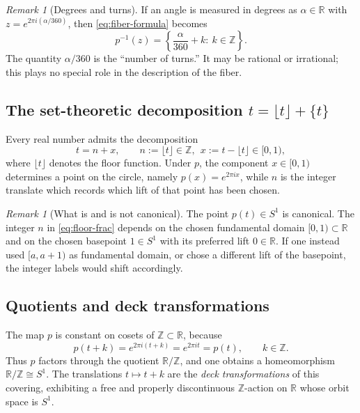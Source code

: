 \documentclass[11pt,a4paper]{article}
\theoremstyle{definition}
\theoremstyle{remark}
\newtheorem{remark}[theorem]{Remark}
\begin{document}
\begin{remark}[Degrees and turns]
\label{rem:degrees}
If an angle is measured in degrees as \(\alpha\in \mathbb{R}\) with \(z=e^{2\pi i (\alpha/360)}\), then \cref{eq:fiber-formula} becomes
\[
p^{-1}(z)=\left\{\frac{\alpha}{360}+k:\ k\in\mathbb{Z}\right\}.
\]
The quantity \(\alpha/360\) is the ``number of turns.'' It may be rational or irrational; this plays no special role in the description of the fiber.
\end{remark}

\subsection{The set-theoretic decomposition \(t = \lfloor t\rfloor + \{t\}\)}
\label{sec:floor-frac}

Every real number admits the decomposition
\begin{equation}
\label{eq:floor-frac}
t = n + x, \qquad n:=\lfloor t\rfloor \in \mathbb{Z},\ \ x:=t-\lfloor t\rfloor\in [0,1),
\end{equation}
where \(\lfloor t\rfloor\) denotes the floor function. Under \(p\), the component \(x\in [0,1)\) determines a point on the circle, namely \(p(x)=e^{2\pi i x}\), while \(n\) is the integer translate which records which lift of that point has been chosen.

\begin{remark}[What is and is not canonical]
\label{rem:noncanonical}
The point \(p(t)\in S^{1}\) is canonical. The integer \(n\) in \cref{eq:floor-frac} depends on the chosen fundamental domain \([0,1)\subset \mathbb{R}\) and on the chosen basepoint \(1\in S^{1}\) with its preferred lift \(0\in \mathbb{R}\). If one instead used \([a,a+1)\) as fundamental domain, or chose a different lift of the basepoint, the integer labels would shift accordingly.
\end{remark}

\subsection{Quotients and deck transformations}
\label{sec:quotient-deck}

The map \(p\) is constant on cosets of \(\mathbb{Z}\subset \mathbb{R}\), because
\[
p(t+k)=e^{2\pi i(t+k)}=e^{2\pi i t}=p(t),\qquad k\in \mathbb{Z}.
\]
Thus \(p\) factors through the quotient \(\mathbb{R}/\mathbb{Z}\), and one obtains a homeomorphism \(\mathbb{R}/\mathbb{Z}\cong S^{1}\). The translations \(t\mapsto t+k\) are the \emph{deck transformations} of this covering, exhibiting a free and properly discontinuous \(\mathbb{Z}\)-action on \(\mathbb{R}\) whose orbit space is \(S^{1}\).
\end{document}
